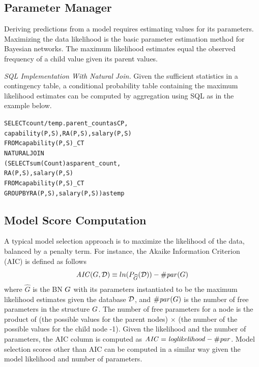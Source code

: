 \documentclass{IEEEtran}
\begin{document}
\subsection{Parameter Manager} \label{sec:parameters}

Deriving predictions from a model requires estimating values for its parameters.  Maximizing the data likelihood is the basic parameter estimation method for Bayesian networks. The maximum likelihood estimates equal the observed frequency of a child value given its parent values.

{\em SQL Implementation With Natural Join.} Given the sufficient statistics in a contingency table, a conditional probability table containing the maximum likelihood estimates can be computed by aggregation using SQL as in the example below. 

\begin{alltt}
SELECT count/temp.parent\_count as CP, 
capability(P,S), RA(P,S), salary(P,S) 
FROM capability(P,S)\_CT 
NATURAL JOIN  
(SELECT sum(Count) as parent\_count, 
RA(P,S), salary(P,S) 
FROM capability(P,S)\_CT  
GROUP BY  RA(P,S), salary(P,S) ) as temp
\end{alltt}










\subsection{Model Score Computation} \label{sec:model-score}
A typical model selection approach is to maximize the likelihood of the data, balanced by a penalty term. For instance, the Akaike Information Criterion (AIC) is defined as follows 
\[
\mathit{AIC}(G,\mathcal{D}) \equiv ln(P_{\widehat{G}}(\mathcal{D})) - \mathit{\#par}(G) \]
where $\widehat{G}$ is the BN $G$ with its parameters instantiated to be the maximum likelihood estimates given the database $\mathcal{D}$, and $\mathit{\#par}(G)$ is the number of free parameters in the structure $G$. 
The number of free parameters for a node is the product of (the possible values for the parent nodes) $\times$ (the number of the possible values for the child node -1). Given the likelihood and the number of parameters, the AIC column is computed as $\mathit{AIC} = \it{loglikelihood} - \mathit{\#par}$. 
 Model selection scores other than AIC can be computed in a similar way given the model likelihood and number of parameters.
\end{document}
